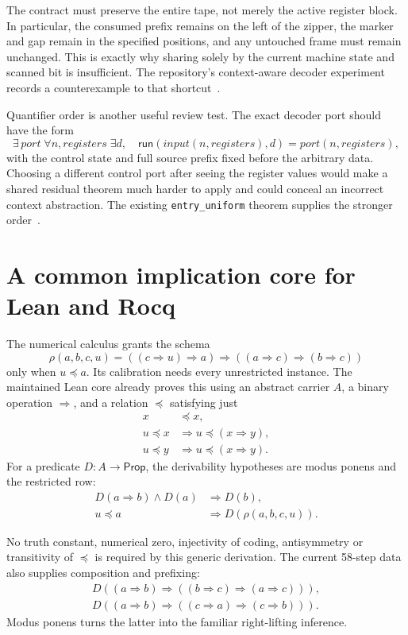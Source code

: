 \documentclass[11pt]{article}
\newcommand{\code}[1]{\texttt{\small #1}}
\begin{document}
The contract must preserve the entire tape, not merely the active register block. In particular, the consumed prefix remains on the left of the zipper, the marker and gap remain in the specified positions, and any untouched frame must remain unchanged. This is exactly why sharing solely by the current machine state and scanned bit is insufficient. The repository's context-aware decoder experiment records a counterexample to that shortcut~\cite{decodersharing}.

Quantifier order is another useful review test. The exact decoder port should have the form
\[
 \exists\,\mathit{port}\;\forall n,\mathit{registers}\;
 \exists d,\quad\mathsf{run}(\mathit{input}(n,\mathit{registers}),d)
    =\mathit{port}(n,\mathit{registers}),
\]
with the control state and full source prefix fixed before the arbitrary data. Choosing a different control port after seeing the register values would make a shared residual theorem much harder to apply and could conceal an incorrect context abstraction. The existing \code{entry\_uniform} theorem supplies the stronger order~\cite{decoder}.

\section{A common implication core for Lean and Rocq}
\label{sec:rho}

The numerical calculus grants the schema
\[
 \rho(a,b,c,u)=((c\Rightarrow u)\Rightarrow a)
              \Rightarrow((a\Rightarrow c)\Rightarrow(b\Rightarrow c))
\]
only when $u\preceq a$. Its calibration needs every unrestricted instance. The maintained Lean core already proves this using an abstract carrier $A$, a binary operation $\Rightarrow$, and a relation $\preceq$ satisfying just
\begin{align*}
 x&\preceq x,\\
 u\preceq x&\Longrightarrow u\preceq(x\Rightarrow y),\\
 u\preceq y&\Longrightarrow u\preceq(x\Rightarrow y).
\end{align*}
For a predicate $D:A\to\mathsf{Prop}$, the derivability hypotheses are modus ponens and the restricted row:
\begin{align*}
 D(a\Rightarrow b)\land D(a)&\Longrightarrow D(b),\\
 u\preceq a&\Longrightarrow D(\rho(a,b,c,u)).
\end{align*}

No truth constant, numerical zero, injectivity of coding, antisymmetry or transitivity of $\preceq$ is required by this generic derivation. The current 58-step data also supplies composition and prefixing:
\begin{align*}
 D((a\Rightarrow b)\Rightarrow((b\Rightarrow c)\Rightarrow(a\Rightarrow c))),\\
 D((a\Rightarrow b)\Rightarrow((c\Rightarrow a)\Rightarrow(c\Rightarrow b))).
\end{align*}
Modus ponens turns the latter into the familiar right-lifting inference.
\end{document}
